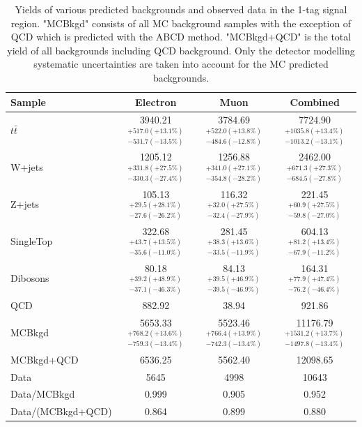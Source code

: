\renewcommand{\arraystretch}{1.5}
\begin{table}
\begin{center}
\begin{tabular}{l|c|c|c}
Sample            & Electron       & Muon      & Combined     \\ 
\hline
$t\bar{t}$        & 3940.21 $^{+517.0(+13.1\%)}_{-531.7(-13.5\%)}$  & 3784.69 $^{+522.0(+13.8\%)}_{-484.6(-12.8\%)}$ & 7724.90 $^{+1035.8(+13.4\%)}_{-1013.2(-13.1\%)}$ \\
W+jets            & 1205.12 $^{+331.8(+27.5\%)}_{-330.3(-27.4\%)}$  & 1256.88 $^{+341.0(+27.1\%)}_{-354.8(-28.2\%)}$ & 2462.00 $^{+671.3(+27.3\%)}_{-684.5(-27.8\%)}$   \\
Z+jets            & 105.13  $^{+29.5(+28.1\%)}_{-27.6(-26.2\%)}$    & 116.32  $^{+32.0(+27.5\%)}_{-32.4(-27.9\%)}$   & 221.45  $^{+60.9(+27.5\%)}_{-59.8(-27.0\%)}$     \\
SingleTop         & 322.68  $^{+43.7(+13.5\%)}_{-35.6(-11.0\%)}$    & 281.45  $^{+38.3(+13.6\%)}_{-33.5(-11.9\%)}$   & 604.13  $^{+81.2(+13.4\%)}_{-67.9(-11.2\%)}$     \\
Dibosons          & 80.18   $^{+39.2(+48.9\%)}_{-37.1(-46.3\%)}$    & 84.13   $^{+39.5(+46.9\%)}_{-39.5(-46.9\%)}$   & 164.31  $^{+77.9(+47.4\%)}_{-76.2(-46.4\%)}$     \\
QCD               & 882.92       & 38.94        & 921.86      \\
\hline
MCBkgd            & 5653.33 $^{+768.2(+13.6\%)}_{-759.3(-13.4\%)}$  & 5523.46 $^{+766.4(+13.9\%)}_{-742.3(-13.4\%)}$  & 11176.79 $^{+1531.2(+13.7\%)}_{-1497.8(-13.4\%)}$    \\
MCBkgd+QCD        & 6536.25      & 5562.40      & 12098.65    \\
Data              & 5645         & 4998         & 10643       \\
\hline
Data/MCBkgd       & 0.999        & 0.905        & 0.952       \\
Data/(MCBkgd+QCD) & 0.864        & 0.899        & 0.880       \\
\end{tabular}
\end{center}
\caption{Yields of various predicted backgrounds and observed data in the 1-tag signal region. "MCBkgd" consists
of all MC background samples with the exception of QCD which is predicted with the ABCD method. "MCBkgd+QCD" is 
the total yield of all backgrounds including QCD background. Only the detector modelling systematic uncertainties are taken
into account for the MC predicted backgrounds.}
\label{tab:boosted_bkgd_1tag0bjet_abcd_a_SR}
\end{table}
\renewcommand{\arraystretch}{1.0}

